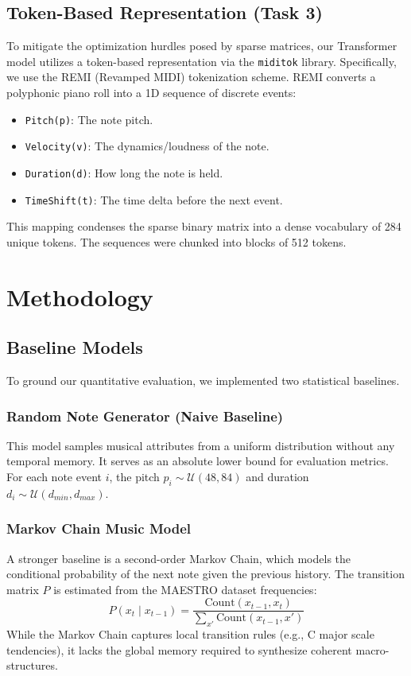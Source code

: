 \documentclass[conference]{IEEEtran}
\begin{document}
\subsection{Token-Based Representation (Task 3)}
To mitigate the optimization hurdles posed by sparse matrices, our Transformer model utilizes a token-based representation via the \texttt{miditok} library. Specifically, we use the REMI (Revamped MIDI) tokenization scheme. 
REMI converts a polyphonic piano roll into a 1D sequence of discrete events:
\begin{itemize}
    \item \texttt{Pitch(p)}: The note pitch.
    \item \texttt{Velocity(v)}: The dynamics/loudness of the note.
    \item \texttt{Duration(d)}: How long the note is held.
    \item \texttt{TimeShift(t)}: The time delta before the next event.
\end{itemize}
This mapping condenses the sparse binary matrix into a dense vocabulary of 284 unique tokens. The sequences were chunked into blocks of 512 tokens.

\section{Methodology}

\subsection{Baseline Models}
To ground our quantitative evaluation, we implemented two statistical baselines.

\subsubsection{Random Note Generator (Naive Baseline)}
This model samples musical attributes from a uniform distribution without any temporal memory. It serves as an absolute lower bound for evaluation metrics. For each note event $i$, the pitch $p_i \sim \mathcal{U}(48, 84)$ and duration $d_i \sim \mathcal{U}(d_{min}, d_{max})$. 

\subsubsection{Markov Chain Music Model}
A stronger baseline is a second-order Markov Chain, which models the conditional probability of the next note given the previous history. The transition matrix $P$ is estimated from the MAESTRO dataset frequencies:
\begin{equation}
    P(x_t \mid x_{t-1}) = \frac{\text{Count}(x_{t-1}, x_t)}{\sum_{x'} \text{Count}(x_{t-1}, x')}
\end{equation}
While the Markov Chain captures local transition rules (e.g., C major scale tendencies), it lacks the global memory required to synthesize coherent macro-structures.
\end{document}
